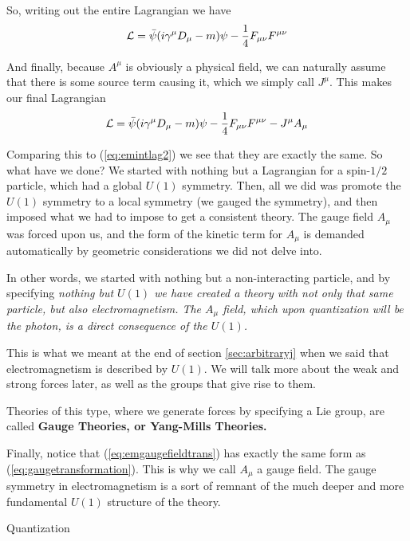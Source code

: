 \documentclass[12pt,epsf]{article}
\makeatletter
\def\subsection{\@startsection{subsection}{2}{\z@}{2.3ex plus .2ex}
 {2.3ex plus .2ex}{\bf}}
\def\nolabel{\nonumber }
\def\nolabel{\nonumber }
\makeatother
\begin{document}
So, writing out the entire Lagrangian we have
\begin{eqnarray}
\mathcal{L} = \bar \psi (i\gamma^{\mu}D_{\mu} - m)\psi -{1\over
4}F_{\mu \nu}F^{\mu \nu} \nolabel
\end{eqnarray}

And finally, because $A^{\mu}$ is obviously a physical field, we can
naturally assume that there is some source term causing it, which we
simply call $J^{\mu}$.	This makes our final Lagrangian 
\begin{eqnarray}
\mathcal{L} = \bar \psi (i\gamma^{\mu}D_{\mu} - m)\psi -{1\over
4}F_{\mu \nu}F^{\mu \nu} - J^{\mu}A_{\mu}\nolabel
\end{eqnarray}

Comparing this to (\ref{eq:emintlag2}) we see that they are exactly the
same.  So what have we done?  We started with nothing but a Lagrangian
for a spin-$1/2$ particle, which had a global $U(1)$ symmetry.	Then,
all we did was promote the $U(1)$ symmetry to a local symmetry (we
gauged the symmetry), and then imposed what we had to impose to get a
consistent theory.  The gauge field $A_{\mu}$ was forced upon us, and
the form of the kinetic term for $A_{\mu}$ is demanded automatically by
geometric considerations we did not delve into.  

In other words, we started with nothing but a non-interacting particle,
and by specifying \it nothing \rm but $U(1)$ we have created a theory
with not only that same particle, but also electromagnetism.  The
$A_{\mu}$ field, which upon quantization will be the photon, is a
direct consequence of the $U(1)$.  

This is what we meant at the end of section \ref{sec:arbitraryj} when
we said that electromagnetism is described by $U(1)$.  We will talk
more about the weak and strong forces later, as well as the groups
that give rise to them.  

Theories of this type, where we generate forces by specifying a Lie
group, are called \bf Gauge Theories\rm, or \bf Yang-Mills Theories\rm. 

Finally, notice that (\ref{eq:emgaugefieldtrans}) has exactly the same
form as (\ref{eq:gaugetransformation}).  This is why we call $A_{\mu}$
a gauge field.	The gauge symmetry in electromagnetism is a sort of
remnant of the much deeper and more fundamental $U(1)$ structure of the
theory.  

\subsection{Quantization}
\end{document}
